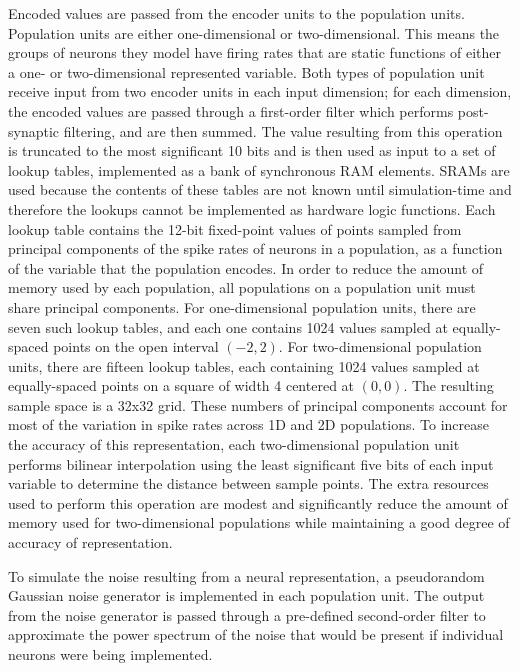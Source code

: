 \documentclass[english]{article}
\begin{document}
Encoded values are passed from the encoder units to the population units. 
Population units are either one-dimensional or two-dimensional.
This means the groups of neurons they model have firing rates that are static functions of either a one- or two-dimensional represented variable.
Both types of population unit receive input from two encoder units in each input dimension;
for each dimension, the encoded values are passed through a first-order filter which performs post-synaptic filtering,
and are then summed. The value resulting from this operation is
truncated to the most significant 10 bits and is then used as input to a set of lookup tables,
implemented as a bank of synchronous RAM elements. SRAMs are used
because the contents of these tables are not known until simulation-time and therefore the lookups cannot be implemented as hardware logic functions.
Each lookup table contains the 12-bit fixed-point values of points sampled from 
principal components of the spike rates of neurons in a population, as a function of the variable that the population encodes.
In order to reduce the amount of memory used by each population, all populations on a population unit must share principal components.
For one-dimensional population units, there are seven such lookup tables, and each one contains
1024 values sampled at equally-spaced points on the open interval $(-2, 2)$. For two-dimensional population units,
there are fifteen lookup tables, each containing 1024 values sampled at equally-spaced points on a square of width 4
centered at $(0, 0)$. The resulting sample space is a 32x32 grid.
These numbers of principal components account for most of the variation in spike rates across 1D and 2D populations.
To increase the accuracy of this representation, each two-dimensional population unit performs bilinear interpolation
using the least significant five bits of each input variable to determine the distance between sample points. 
The extra resources used to perform this operation are modest
and significantly reduce the amount of memory used for two-dimensional populations while maintaining a good degree of accuracy of representation.

To simulate the noise resulting from a neural representation, a pseudorandom Gaussian noise generator is implemented in each population unit.
The output from the noise generator is passed through a pre-defined second-order filter to approximate the power spectrum of the noise
that would be present if individual neurons were being implemented. %
\end{document}

